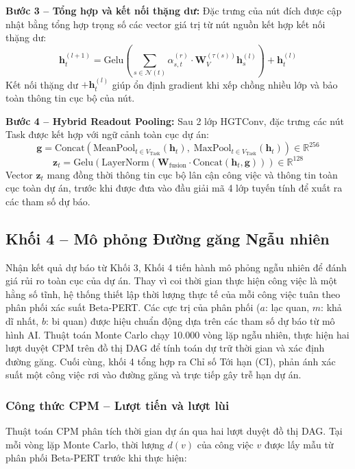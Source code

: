 \textbf{Bước 3 -- Tổng hợp và kết nối thặng dư:} Đặc trưng của nút đích được cập nhật bằng tổng hợp trọng số các vector giá trị từ nút nguồn kết hợp kết nối thặng dư:
$$\mathbf{h}_t^{(l+1)} = \text{Gelu}\!\left( \sum_{s \in \mathcal{N}(t)} \alpha_{s,t}^{(r)} \cdot \mathbf{W}_V^{(\tau(s))} \mathbf{h}_s^{(l)} \right) + \mathbf{h}_t^{(l)}$$
Kết nối thặng dư $+ \mathbf{h}_t^{(l)}$ giúp ổn định gradient khi xếp chồng nhiều lớp và bảo toàn thông tin cục bộ của nút.

\textbf{Bước 4 -- Hybrid Readout Pooling:} Sau 2 lớp HGTConv, đặc trưng các nút Task được kết hợp với ngữ cảnh toàn cục dự án:
$$\mathbf{g} = \mathrm{Concat}\!\left(\mathrm{MeanPool}_{t \in V_{\text{Task}}}(\mathbf{h}_t),\; \mathrm{MaxPool}_{t \in V_{\text{Task}}}(\mathbf{h}_t)\right) \in \mathbb{R}^{256}$$
$$\mathbf{z}_t = \text{Gelu}\!\left(\text{LayerNorm}\!\left(\mathbf{W}_{\text{fusion}} \cdot \mathrm{Concat}(\mathbf{h}_t, \mathbf{g})\right)\right) \in \mathbb{R}^{128}$$
Vector $\mathbf{z}_t$ mang đồng thời thông tin cục bộ lân cận công việc và thông tin toàn cục toàn dự án, trước khi được đưa vào đầu giải mã 4 lớp tuyến tính để xuất ra các tham số dự báo.

\subsection{Khối 4 -- Mô phỏng Đường găng Ngẫu nhiên}
Nhận kết quả dự báo từ Khối 3, Khối 4 tiến hành mô phỏng ngẫu nhiên để đánh giá rủi ro toàn cục của dự án. Thay vì coi thời gian thực hiện công việc là một hằng số tĩnh, hệ thống thiết lập thời lượng thực tế của mỗi công việc tuân theo phân phối xác suất Beta-PERT. Các cực trị của phân phối ($a$: lạc quan, $m$: khả dĩ nhất, $b$: bi quan) được hiệu chuẩn động dựa trên các tham số dự báo từ mô hình AI. Thuật toán Monte Carlo chạy 10.000 vòng lặp ngẫu nhiên, thực hiện hai lượt duyệt CPM trên đồ thị DAG để tính toán dự trữ thời gian và xác định đường găng. Cuối cùng, khối 4 tổng hợp ra Chỉ số Tới hạn (CI), phản ánh xác suất một công việc rơi vào đường găng và trực tiếp gây trễ hạn dự án.

\subsubsection{Công thức CPM -- Lượt tiến và lượt lùi}
Thuật toán CPM phân tích thời gian dự án qua hai lượt duyệt đồ thị DAG. Tại mỗi vòng lặp Monte Carlo, thời lượng $d(v)$ của công việc $v$ được lấy mẫu từ phân phối Beta-PERT trước khi thực hiện:

